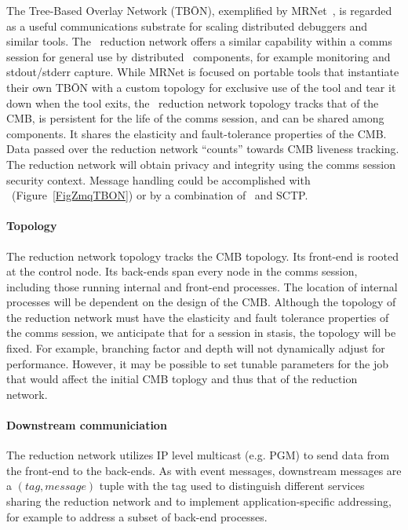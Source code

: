 The Tree-Based Overlay Network (TB\={O}N), exemplified by MRNet~\cite{MRNet},
is regarded as a useful communications substrate for scaling
distributed debuggers and similar tools.
The \ngrm\ reduction network offers a similar capability
within a comms session for general use by distributed \ngrm\ components,
for example monitoring and stdout/stderr capture.
While MRNet is focused on portable tools that instantiate their own TB\={O}N
with a custom topology for exclusive use of the tool and tear it down when
the tool exits,
the \ngrm\ reduction network topology tracks that of the CMB,
is persistent for the life of the comms session,
and can be shared among components.
It shares the elasticity and fault-tolerance properties of the CMB.
Data passed over the reduction network ``counts'' towards CMB liveness
tracking.
The reduction network will obtain privacy and integrity using the comms
session security context.
Message handling could be accomplished with
\zMQ\ (Figure~\ref{FigZmqTBON}) or by a combination of \zMQ\ and SCTP.

\paragraph{Topology}
The reduction network topology tracks the CMB topology.
Its front-end is rooted at the control node.
Its back-ends span every node in the comms session, including those
running internal and front-end processes.
The location of internal processes will be dependent on the design of
the CMB.
Although the topology of the reduction network must have the elasticity
and fault tolerance properties of the comms session,
we anticipate that for a session in stasis, the topology will be fixed.
For example, branching factor and depth will not dynamically adjust for
performance.
However, it may be possible to set tunable parameters for the job that
would affect the initial CMB toplogy and thus that of the reduction network.

\paragraph{Downstream communiciation}
\ifcomments
{}
\fi
The reduction network utilizes IP level multicast (e.g. PGM) to send
data from the front-end to the back-ends.
As with event messages, downstream messages are a
$(tag, message)$ tuple with the tag used to distinguish different
services sharing the reduction network and to implement application-specific
addressing, for example to address a subset of back-end processes.

